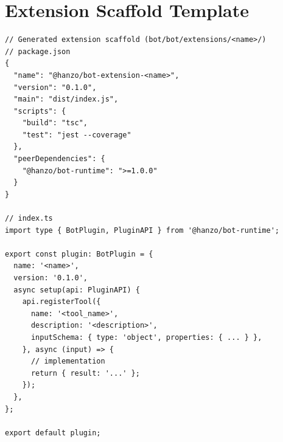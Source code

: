\section{Extension Scaffold Template}

\label{app:ext-scaffold}

\begin{verbatim}
// Generated extension scaffold (bot/bot/extensions/<name>/)
// package.json
{
  "name": "@hanzo/bot-extension-<name>",
  "version": "0.1.0",
  "main": "dist/index.js",
  "scripts": {
    "build": "tsc",
    "test": "jest --coverage"
  },
  "peerDependencies": {
    "@hanzo/bot-runtime": ">=1.0.0"
  }
}

// index.ts
import type { BotPlugin, PluginAPI } from '@hanzo/bot-runtime';

export const plugin: BotPlugin = {
  name: '<name>',
  version: '0.1.0',
  async setup(api: PluginAPI) {
    api.registerTool({
      name: '<tool_name>',
      description: '<description>',
      inputSchema: { type: 'object', properties: { ... } },
    }, async (input) => {
      // implementation
      return { result: '...' };
    });
  },
};

export default plugin;
\end{verbatim}

